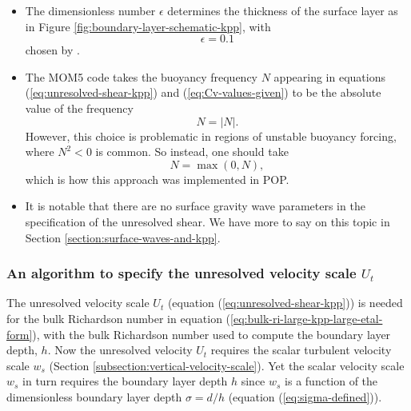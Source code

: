 \begin{itemize}
\item The dimensionless number $\epsilon$ determines the thickness of
  the surface layer as in Figure
  \ref{fig:boundary-layer-schematic-kpp}, with
\begin{equation}
 \epsilon = 0.1 
\end{equation}
chosen by \cite{LargeKPP}.  

\item The MOM5 code takes the buoyancy frequency $N$ appearing in
  equations (\ref{eq:unresolved-shear-kpp}) and
  (\ref{eq:Cv-values-given}) to be the absolute value of the frequency
\begin{equation}
 N  = |N|.  
\end{equation}
However, this choice is problematic in regions of unstable buoyancy
forcing, where $N^{2} < 0$ is common.  So instead, one should take 
\begin{equation}
 N = \max(0,N),
\end{equation}
 which is how this approach was implemented in POP.  
 
\item It is notable that there are no surface gravity wave parameters in the
specification of the unresolved shear.  We have more to say on this
topic in Section \ref{section:surface-waves-and-kpp}. 

\end{itemize}


\subsubsection{An algorithm to specify the unresolved velocity scale $U_{t}$}

The unresolved velocity scale $U_{t}$ (equation
(\ref{eq:unresolved-shear-kpp})) is needed for the bulk Richardson
number in equation (\ref{eq:bulk-ri-large-kpp-large-etal-form}), with
the bulk Richardson number used to compute the boundary layer depth,
$h$.  Now the unresolved velocity $U_{t}$ requires the scalar
turbulent velocity scale $w_{s}$ (Section
\ref{subsection:vertical-velocity-scale}).  Yet the scalar velocity
scale $w_{s}$ in turn requires the boundary layer depth $h$ since
$w_{s}$ is a function of the dimensionless boundary layer depth
$\sigma = d/h$ (equation (\ref{eq:sigma-defined})). 

